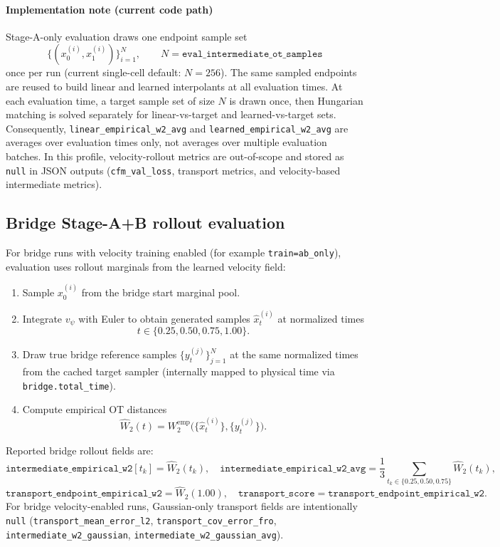 \documentclass[11pt]{article}
\begin{document}
\paragraph{Implementation note (current code path)}
Stage-A-only evaluation draws one endpoint sample set
\[
\{(x_0^{(i)},x_1^{(i)})\}_{i=1}^N,\qquad
N=\texttt{eval\_intermediate\_ot\_samples}
\]
once per run (current single-cell default: $N=256$).
The same sampled endpoints are reused to build linear and learned interpolants at all evaluation times.
At each evaluation time, a target sample set of size $N$ is drawn once, then Hungarian matching is solved separately for linear-vs-target and learned-vs-target sets.
Consequently, \texttt{linear\_empirical\_w2\_avg} and \texttt{learned\_empirical\_w2\_avg} are averages over evaluation times only, not averages over multiple evaluation batches.
In this profile, velocity-rollout metrics are out-of-scope and stored as \texttt{null} in JSON outputs (\texttt{cfm\_val\_loss}, transport metrics, and velocity-based intermediate metrics).

\subsection*{Bridge Stage-A+B rollout evaluation}
For bridge runs with velocity training enabled (for example \texttt{train=ab\_only}), evaluation uses rollout marginals from the learned velocity field:
\begin{enumerate}
    \item Sample $x_0^{(i)}$ from the bridge start marginal pool.
    \item Integrate $v_\psi$ with Euler to obtain generated samples $\hat{x}^{(i)}_t$ at normalized times
    \[
    t\in\{0.25,0.50,0.75,1.00\}.
    \]
    \item Draw true bridge reference samples $\{y_t^{(j)}\}_{j=1}^N$ at the same normalized times from the cached target sampler (internally mapped to physical time via \texttt{bridge.total\_time}).
    \item Compute empirical OT distances
    \[
    \widehat{W}_2(t)
    =
    W_2^{\mathrm{emp}}\big(\{\hat{x}^{(i)}_t\},\{y_t^{(j)}\}\big).
    \]
\end{enumerate}
Reported bridge rollout fields are:
\[
\texttt{intermediate\_empirical\_w2}[t_k]=\widehat{W}_2(t_k),\quad
\texttt{intermediate\_empirical\_w2\_avg}=\frac{1}{3}\sum_{t_k\in\{0.25,0.50,0.75\}}\widehat{W}_2(t_k),
\]
\[
\texttt{transport\_endpoint\_empirical\_w2}=\widehat{W}_2(1.00),\quad
\texttt{transport\_score}=\texttt{transport\_endpoint\_empirical\_w2}.
\]
For bridge velocity-enabled runs, Gaussian-only transport fields are intentionally \texttt{null}
(\texttt{transport\_mean\_error\_l2}, \texttt{transport\_cov\_error\_fro}, \texttt{intermediate\_w2\_gaussian}, \texttt{intermediate\_w2\_gaussian\_avg}).
\end{document}
